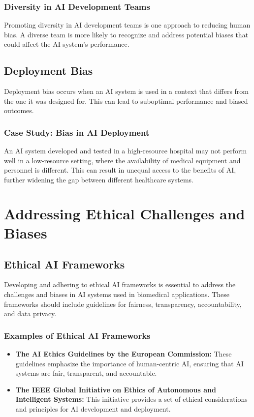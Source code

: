 \documentclass{article}
\begin{document}
\subsubsection{Diversity in AI Development Teams}
Promoting diversity in AI development teams is one approach to reducing human bias. A diverse team is more likely to recognize and address potential biases that could affect the AI system's performance.

\subsection{Deployment Bias}
Deployment bias occurs when an AI system is used in a context that differs from the one it was designed for. This can lead to suboptimal performance and biased outcomes.

\subsubsection{Case Study: Bias in AI Deployment}
An AI system developed and tested in a high-resource hospital may not perform well in a low-resource setting, where the availability of medical equipment and personnel is different. This can result in unequal access to the benefits of AI, further widening the gap between different healthcare systems.

\section{Addressing Ethical Challenges and Biases}

\subsection{Ethical AI Frameworks}
Developing and adhering to ethical AI frameworks is essential to address the challenges and biases in AI systems used in biomedical applications. These frameworks should include guidelines for fairness, transparency, accountability, and data privacy.

\subsubsection{Examples of Ethical AI Frameworks}
\begin{itemize}
    \item \textbf{The AI Ethics Guidelines by the European Commission:} These guidelines emphasize the importance of human-centric AI, ensuring that AI systems are fair, transparent, and accountable.
    \item \textbf{The IEEE Global Initiative on Ethics of Autonomous and Intelligent Systems:} This initiative provides a set of ethical considerations and principles for AI development and deployment.
\end{itemize}
\end{document}

